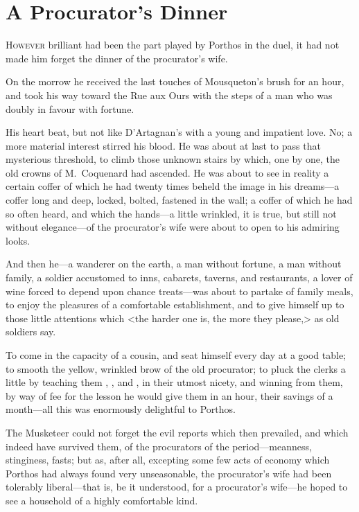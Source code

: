 
\chapter{A Procurator's Dinner}

\lettrine{H}{owever} brilliant had been the part played by Porthos in the duel, it had not made him forget the dinner of the procurator's wife. 

\zz
On the morrow he received the last touches of Mousqueton's brush for an hour, and took his way toward the Rue aux Ours with the steps of a man who was doubly in favour with fortune. 

His heart beat, but not like D'Artagnan's with a young and impatient love. No; a more material interest stirred his blood. He was about at last to pass that mysterious threshold, to climb those unknown stairs by which, one by one, the old crowns of M.~Coquenard had ascended. He was about to see in reality a certain coffer of which he had twenty times beheld the image in his dreams—a coffer long and deep, locked, bolted, fastened in the wall; a coffer of which he had so often heard, and which the hands—a little wrinkled, it is true, but still not without elegance—of the procurator's wife were about to open to his admiring looks. 

And then he—a wanderer on the earth, a man without fortune, a man without family, a soldier accustomed to inns, cabarets, taverns, and restaurants, a lover of wine forced to depend upon chance treats—was about to partake of family meals, to enjoy the pleasures of a comfortable establishment, and to give himself up to those little attentions which <the harder one is, the more they please,> as old soldiers say. 

To come in the capacity of a cousin, and seat himself every day at a good table; to smooth the yellow, wrinkled brow of the old procurator; to pluck the clerks a little by teaching them , , and , in their utmost nicety, and winning from them, by way of fee for the lesson he would give them in an hour, their savings of a month—all this was enormously delightful to Porthos. 

The Musketeer could not forget the evil reports which then prevailed, and which indeed have survived them, of the procurators of the period—meanness, stinginess, fasts; but as, after all, excepting some few acts of economy which Porthos had always found very unseasonable, the procurator's wife had been tolerably liberal—that is, be it understood, for a procurator's wife—he hoped to see a household of a highly comfortable kind. 

